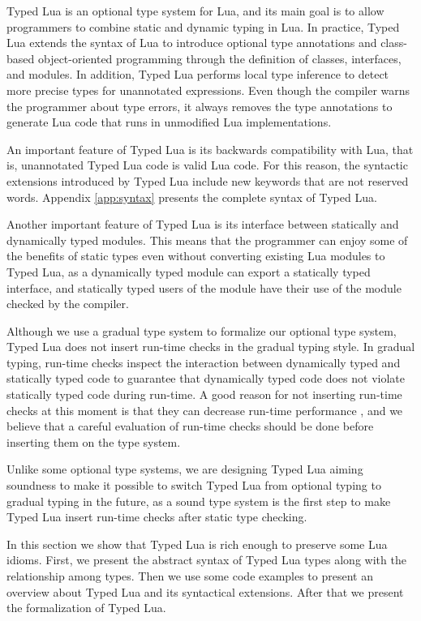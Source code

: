 Typed Lua is an optional type system for Lua, and its main goal is to
allow programmers to combine static and dynamic typing in Lua.
In practice, Typed Lua extends the syntax of Lua to introduce
optional type annotations and class-based object-oriented
programming through the definition of classes, interfaces, and
modules.
In addition, Typed Lua performs local type inference \citep{pierce2000lti}
to detect more precise types for unannotated expressions.
Even though the compiler warns the programmer about type errors,
it always removes the type annotations to generate Lua code that
runs in unmodified Lua implementations.

An important feature of Typed Lua is its backwards compatibility with Lua,
that is, unannotated Typed Lua code is valid Lua code.
For this reason, the syntactic extensions introduced by Typed Lua
include new keywords that are not reserved words.
Appendix \ref{app:syntax} presents the complete syntax of Typed Lua.

Another important feature of Typed Lua is its interface between
statically and dynamically typed modules. 
This means that the programmer can enjoy some of the benefits of
static types even without converting existing Lua modules to Typed Lua,
as a dynamically typed module can export a statically typed interface,
and statically typed users of the module have their use of the module
checked by the compiler.

Although we use a gradual type system to formalize our optional type system,
Typed Lua does not insert run-time checks in the gradual typing style.
In gradual typing, run-time checks inspect the interaction between
dynamically typed and statically typed code to guarantee that dynamically
typed code does not violate statically typed code during run-time.
A good reason for not inserting run-time checks at this moment is that they
can decrease run-time performance \citep{allende2013cis}, and we believe that
a careful evaluation of run-time checks should be done before inserting them
on the type system.

Unlike some optional type systems, we are designing Typed Lua aiming soundness
to make it possible to switch Typed Lua from optional typing to gradual typing
in the future, as a sound type system is the first step to make Typed Lua
insert run-time checks after static type checking.

In this section we show that Typed Lua is rich enough to preserve some Lua idioms.
First, we present the abstract syntax of Typed Lua types along with the
relationship among types.
Then we use some code examples to present an overview about Typed Lua and
its syntactical extensions.
After that we present the formalization of Typed Lua.

